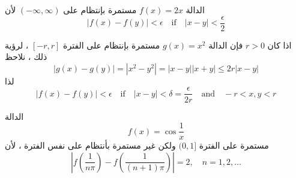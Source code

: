 \begin{example}
	الدالة $ f(x) = 2x$ مستمرة بإنتظام على 
	$(-\infty, \infty)$
	لأن
	\[
	|f(x) - f(y)| < \epsilon \quad\text{if}\quad |x-y| < \frac{\epsilon}{2} 
	\]
\end{example}

\begin{example}
	اذا كان $r> 0 $ فإن الدالة $g(x) = x^2 $ مستمرة بإنتظام على الفترة $[-r,r]$ ، لرؤية ذلك ، نلاحظ
	\[
	|g(x) - g(y) | = |x^2 - y^2| = |x-y| |x+y| \leq 2r |x-y|
	\]
	لذا
	\[
    |f(x) - f(y)| < \epsilon \quad\text{if}\quad |x-y| < \delta = \frac{\epsilon}{2r} \quad\text{and}\quad -r < x,y < r
 	\]
\end{example}

\begin{example}
	الدالة
	\[
	f(x) = \cos \frac{1}{x}
	\]
	مستمرة على الفترة
	$(0,1]$
	ولكن غير مستمرة بأنتظام على نفس الفترة ، لأن
	\[
	\left|f\left(\frac{1}{n\pi} \right) - f\left(\frac{1}{(n+1)\pi}\right)\right| =2 , \quad n=1,2,\dots
	\]
\end{example}

\newpage

